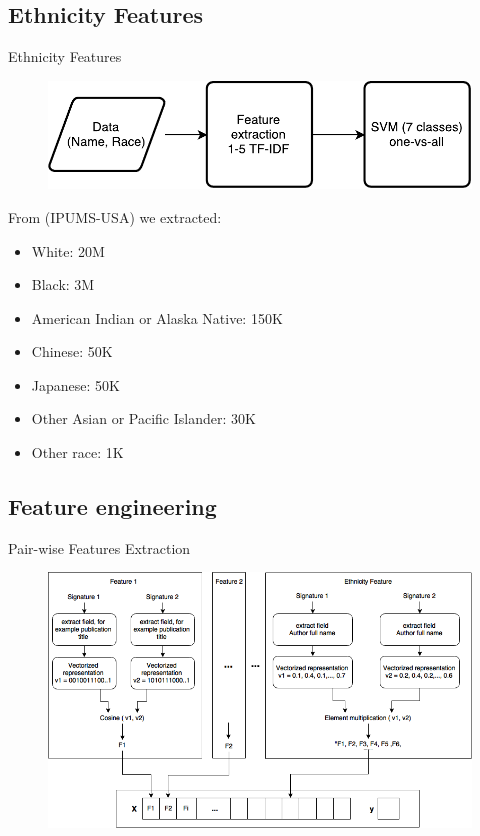 \documentclass{beamer}
\begin{document}

\subsection{Ethnicity Features}
\begin{frame}{Ethnicity Features}

\begin{figure}
   \centering
   \includegraphics[width=.7\textwidth]{./figures/ethnicity.pdf}
\end{figure}
 From (IPUMS-USA) we extracted:
\begin{itemize}

\item White: 20M
\item Black: 3M
\item American Indian or Alaska Native: 150K
\item Chinese: 50K
\item Japanese: 50K
\item Other Asian or Pacific Islander: 30K
\item Other race: 1K
\end{itemize}


\end{frame}


\subsection{Feature engineering}
\begin{frame}{Pair-wise Features Extraction}

\begin{figure}
   \centering
   \includegraphics[width=\textwidth]{./figures/pairwise_features.png}
\end{figure}

\end{frame}
\end{document}
